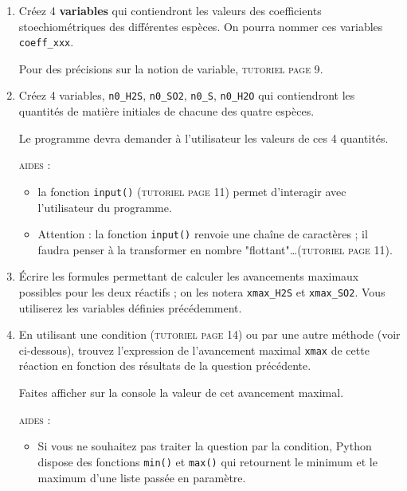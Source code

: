 \documentclass[11pt]{article}
\begin{document}
\begin{enumerate}
\item Créez 4 \textbf{variables} qui contiendront les valeurs des coefficients stoechiométriques des différentes espèces. On pourra nommer ces variables \texttt{coeff\_xxx}.

\smallskip
Pour des précisions sur la notion de variable, \textsc{tutoriel page 9}.




\medskip

 \item Créez 4 variables, \texttt{n0\_H2S}, \texttt{n0\_SO2}, \texttt{n0\_S}, \texttt{n0\_H2O} qui contiendront les quantités de matière initiales de chacune des quatre espèces.
 
Le programme devra demander à l'utilisateur les valeurs de ces 4 quantités.

\smallskip
\textsc{aides : }
\begin{itemize}
 \item la fonction \texttt{input()} (\textsc{tutoriel page 11}) permet d'interagir avec l'utilisateur du programme.
 \item Attention : la fonction \texttt{input()} renvoie une chaîne de caractères ; il faudra penser à la transformer en nombre "flottant"\ldots (\textsc{tutoriel page 11}).
\end{itemize}


\medskip

 \item Écrire les formules permettant de calculer les avancements maximaux possibles pour les deux réactifs ; on les notera \texttt{xmax\_H2S} et \texttt{xmax\_SO2}. Vous utiliserez les variables définies précédemment.
 

 
 \medskip
 
 \item En utilisant une condition (\textsc{tutoriel page 14}) ou par une autre méthode (voir ci-dessous), trouvez l'expression de l'avancement maximal \texttt{xmax} de cette réaction en fonction des résultats de la question précédente. 
 
 Faites afficher sur la console la valeur de cet avancement maximal.
 
 \smallskip
 \textsc{aides : }
\begin{itemize} 
\item Si vous ne souhaitez pas traiter la question par la condition, Python dispose des fonctions \texttt{min()} et \texttt{max()} qui retournent le minimum et le maximum d'une liste passée en paramètre.



\end{itemize}
\end{enumerate}
\end{document}
